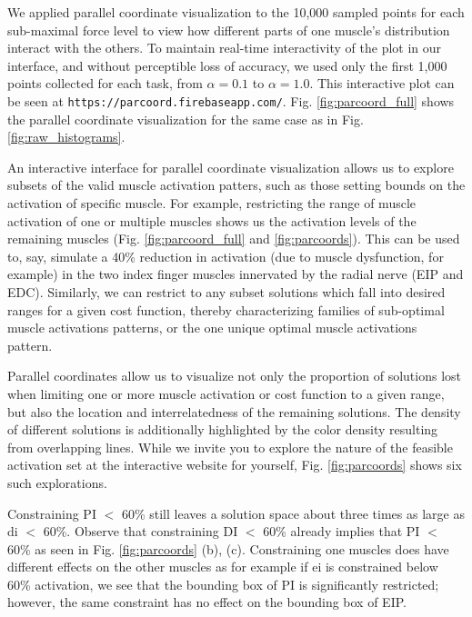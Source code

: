 \documentclass[10pt,letterpaper]{article}
\begin{document}
We applied parallel coordinate visualization to the 10,000 sampled points for each sub-maximal force level to view how different parts of one muscle's distribution interact with the others.
To maintain real-time interactivity of the plot in our interface, and without perceptible loss of accuracy, we used only the first 1,000 points collected for each task, from $\alpha = 0.1$ to $\alpha = 1.0$. This interactive plot can be seen at \texttt{https://parcoord.firebaseapp.com/}. Fig. \ref{fig:parcoord_full} shows the parallel coordinate visualization for the same case as in Fig. \ref{fig:raw_histograms}.

An interactive interface for parallel coordinate visualization allows us to explore subsets of the valid muscle activation patters, such as those setting bounds on the activation of specific muscle. For example, restricting the range of muscle activation of one or multiple muscles shows us the activation levels of the remaining muscles (Fig. \ref{fig:parcoord_full} and \ref{fig:parcoords}).
This can be used to, say, simulate  a 40\% reduction in activation (due to muscle dysfunction, for example) in the two index finger muscles innervated by the radial nerve (EIP and EDC). Similarly, we can restrict to any subset solutions which fall into desired ranges for a given cost function, thereby characterizing families of sub-optimal muscle activations patterns, or the one unique optimal muscle activations pattern.

Parallel coordinates allow us to visualize not only the proportion of solutions lost when limiting one or more muscle activation or cost function to a given range, but also the location and interrelatedness of the remaining solutions. The density of different solutions is additionally highlighted by the color density resulting from  overlapping  lines. While we invite you to explore the nature of the feasible activation set at the interactive website for yourself, Fig. \ref{fig:parcoords} shows six such explorations.



Constraining PI $<$ 60\% still leaves a solution space about three times as large as di $<$ 60\%. 
Observe that constraining DI $<$ 60\% already implies that PI $<$ 60\% as seen in Fig. \ref{fig:parcoords} (b), (c). 
Constraining one muscles does have different effects on the other muscles as for example if ei is constrained below 60\% activation, we see that the bounding box of PI is significantly restricted; however, the same constraint has no effect on the bounding box of EIP.
\end{document}
